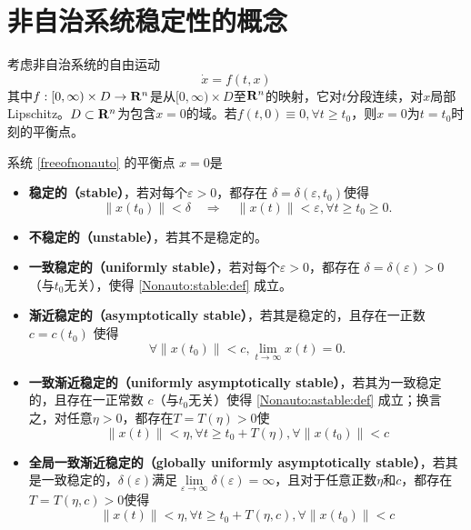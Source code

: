 \section{非自治系统稳定性的概念}\label{3Bref}
考虑非自治系统的自由运动
\begin{equation}\label{freeofnonauto}
  \dot{x}=f(t,x)
\end{equation}
其中$f : [0, \infty) \times D \rightarrow \mathbf{R}{}^n$是从$[0, \infty) \times D$至$\mathbf{R}{}^n$的映射，它对$t$分段连续，对$x$局部Lipschitz。$D\subset\mathbf{R}{}^n$为包含$x=0$的域。若$f(t,0)\equiv0,\forall t\ge t_0$，则$x=0$为$t=t_0$时刻的平衡点。
\begin{definition}[非自治系统的稳定性]
 系统 \eqref{freeofnonauto} 的平衡点 $x = 0$是
  \begin{itemize}[leftmargin=1em]
    \item {\bf 稳定的（stable）}，若对每个$\varepsilon > 0$，都存在 $\delta =
    \delta (\varepsilon, t_0)$使得
    \begin{equation}
      \| x (t_0) \| < \delta \quad \Rightarrow \quad \| x (t) \| <
      \varepsilon, \forall t \geq t_0 \geq 0 \label{Nonauto:stable:def} .
    \end{equation}
    \item {\bf 不稳定的（unstable）}，若其不是稳定的。
    
    \item {\bf 一致稳定的（uniformly stable）}，若对每个$\varepsilon > 0$，都存在
    $\delta = \delta (\varepsilon) > 0$（与$t_0$无关），使得 \eqref{Nonauto:stable:def} 成立。
    
    \item {\bf 渐近稳定的（asymptotically stable）}，若其是稳定的，且存在一正数
     $c = c (t_0)$ 使得
    \begin{equation}
      \forall \| x (t_0) \| < c, \lim_{t \rightarrow \infty} x (t) = 0 \label{Nonauto:astable:def} .
    \end{equation}
    \item {\bf 一致渐近稳定的（uniformly asymptotically stable）}，若其为一致稳定的，且存在一正常数 $c$（与$t_0$无关）使得 \eqref{Nonauto:astable:def} 成立；换言之，对任意$\eta>0$，都存在$T=T(\eta)>0$使
    \[\|x(t)\|<\eta,\forall t\ge t_0+T(\eta),\forall\|x(t_0)\|<c\]
    
    \item {\bf 全局一致渐近稳定的（globally uniformly asymptotically stable）}，若其是一致稳定的，$\delta(\varepsilon)$满足$\lim\limits_{\varepsilon\to\infty}\delta(\varepsilon)=\infty$，且对于任意正数$\eta$和$c$，都存在$T=T(\eta,c)>0$使得
    \[\|x(t)\|<\eta,\forall t\ge t_0+T(\eta,c),\forall\|x(t_0)\|<c\]
  \end{itemize}
\end{definition}
